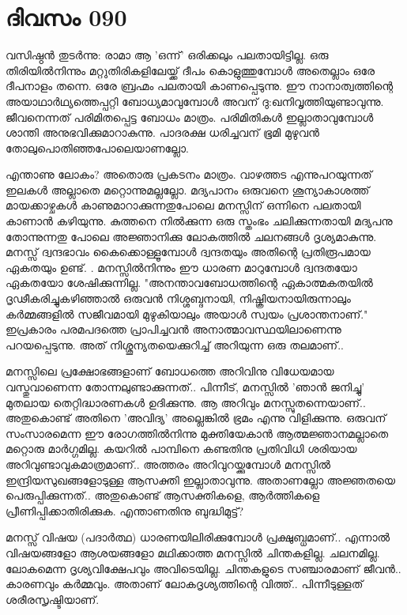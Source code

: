 \newpage
\section{ദിവസം 090}


വസിഷ്ഠന്‍ തുടര്‍ന്നു: രാമാ ആ 'ഒന്ന്' ഒരിക്കലും പലതായിട്ടില്ല. ഒരു തിരിയില്‍നിന്നും മറ്റുതിരികളിലേയ്ക്ക്‌ ദീപം കൊളുത്തുമ്പോള്‍ അതെല്ലാം ഒരേ ദീപനാളം തന്നെ. ഒരേ ബ്രഹ്മം പലതായി കാണപ്പെടുന്നു. ഈ നാനാത്വത്തിന്റെ അയാഥാര്‍ഥ്യത്തെപ്പറ്റി ബോധ്യമാവുമ്പോള്‍ അവന്‌ ദു:ഖനിവൃത്തിയുണ്ടാവുന്നു. ജീവനെന്നത്‌ പരിമിതപ്പെട്ട ബോധം മാത്രം. പരിമിതികള്‍ ഇല്ലാതാവുമ്പോള്‍ ശാന്തി അനുഭവിക്കുമാറാകുന്നു. പാദരക്ഷ ധരിച്ചവന്‌ ഭൂമി മുഴുവന്‍ തോലുപൊതിഞ്ഞപോലെയാണല്ലോ.

എന്താണു ലോകം? അതൊരു പ്രകടനം മാത്രം. വാഴത്തട എന്നുപറയുന്നത്‌ ഇലകള്‍ അല്ലാതെ മറ്റൊന്നുമല്ലല്ലോ. മദ്യപാനം ഒരുവനെ ശൂന്യാകാശത്ത്‌ മായക്കാഴ്ചകള്‍ കാണുമാറാക്കുന്നതുപോലെ മനസ്സിന്‌ ഒന്നിനെ പലതായി കാണാന്‍ കഴിയുന്നു. കുത്തനെ നില്‍ക്കുന്ന ഒരു സ്തംഭം ചലിക്കുന്നതായി മദ്യപനു തോന്നുന്നതു പോലെ അജ്ഞാനിക്കു ലോകത്തില്‍ ചലനങ്ങള്‍ ദൃശ്യമാകുന്നു. മനസ്സ്‌ ദ്വന്ദഭാവം കൈക്കൊള്ളൂമ്പോള്‍ ദ്വന്ദതയും അതിന്റെ പ്രതിരൂപമായ ഏകതയും ഉണ്ട്‌. . മനസ്സില്‍നിന്നും ഈ ധാരണ മാറുമ്പോള്‍ ദ്വന്ദതയോ ഏകതയോ ശേഷിക്കുന്നില്ല. "അനന്താവബോധത്തിന്റെ ഏകാത്മകതയില്‍ ദൃഢീകരിച്ചുകഴിഞ്ഞാല്‍ ഒരുവന്‍ നിശ്ശബ്ദനായി, നിഷ്ക്രിയനായിരുന്നാലും കര്‍മ്മങ്ങളില്‍ സജീവമായി മുഴുകിയാലും അയാള്‍ സ്വയം പ്രശാന്തനാണ്‌." ഇപ്രകാരം പരമപദത്തെ പ്രാപിച്ചവന്‍ അനാത്മാവസ്ഥയിലാണെന്നു പറയപ്പെടുന്നു. അത്‌ നിശ്ശൂന്യതയെക്കുറിച്ച്‌ അറിയുന്ന ഒരു തലമാണ്‌..

മനസ്സിലെ പ്രക്ഷോഭങ്ങളാണ്‌ ബോധത്തെ അറിവിനു വിധേയമായ വസ്തുവാണെന്ന തോന്നലുണ്ടാക്കുന്നത്‌.. പിന്നീട്‌, മനസ്സില്‍ 'ഞാന്‍ ജനിച്ചു' മുതലായ തെറ്റിദ്ധാരണകള്‍ ഉദിക്കുന്നു. ആ അറിവും മനസ്സുതന്നെയാണ്‌.. അതുകൊണ്ട്‌ അതിനെ 'അവിദ്യ' അല്ലെങ്കില്‍ ഭ്രമം എന്നു വിളിക്കുന്നു. ഒരുവന്‌ സംസാരമെന്ന ഈ രോഗത്തില്‍നിന്നു മുക്തിയേകാന്‍ ആത്മജ്ഞാനമല്ലാതെ മറ്റൊരു മാര്‍ഗ്ഗമില്ല. കയറില്‍ പാമ്പിനെ കണ്ടതിനു പ്രതിവിധി ശരിയായ അറിവുണ്ടാവുകമാത്രമാണ്‌.. അത്തരം അറിവുറയ്ക്കുമ്പോള്‍ മനസ്സില്‍ ഇന്ദ്രിയസുഖങ്ങളോടുള്ള ആസക്തി ഇല്ലാതാവുന്നു. അതാണല്ലോ അജ്ഞതയെ പെരുപ്പിക്കുന്നത്‌.. അതുകൊണ്ട്‌ ആസക്തികളെ, ആര്‍ത്തികളെ പ്രീണിപ്പിക്കാതിരിക്കുക. എന്താണതിനു ബുദ്ധിമുട്ട്‌?

മനസ്സ്‌ വിഷയ (പദാര്‍ത്ഥ) ധാരണയിലിരിക്കുമ്പോള്‍ പ്രക്ഷുബ്ധമാണ്‌.. എന്നാല്‍ വിഷയങ്ങളോ ആശയങ്ങളോ മഥിക്കാത്ത മനസ്സില്‍ ചിന്തകളില്ല. ചലനമില്ല. ലോകമെന്ന ദൃശ്യവിക്ഷേപവും അവിടെയില്ല. ചിന്തകളുടെ സഞ്ചാരമാണ്‌ ജീവന്‍.. കാരണവും കര്‍മ്മവും. അതാണ്‌ ലോകദൃശ്യത്തിന്റെ വിത്ത്‌.. പിന്നീടുള്ളത്‌ ശരീരസൃഷ്ടിയാണ്‌.

